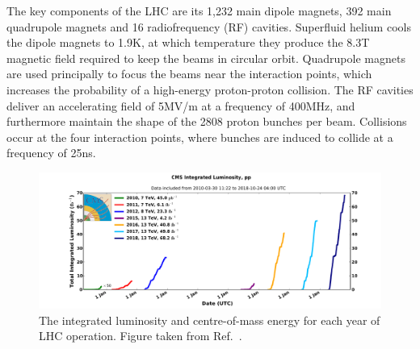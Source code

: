 The key components of the LHC are its 1,232 main dipole magnets, 392 main quadrupole magnets and 16 radiofrequency (RF) cavities.
Superfluid helium cools the dipole magnets to 1.9K, at which temperature they produce the 8.3T magnetic field required to keep the beams in circular orbit.
Quadrupole magnets are used principally to focus the beams near the interaction points, which increases the probability of a high-energy proton-proton collision.
The RF cavities deliver an accelerating field of 5MV/m at a frequency of 400MHz, and furthermore maintain the shape of the 2808 proton bunches per beam.
Collisions occur at the four interaction points, where bunches are induced to collide at a frequency of 25ns. 

\begin{figure}[h!]
  \centering
  \includegraphics[width=\textwidth]{Figures/Detector/Run1andRun2lumi.pdf}
  \caption[LHC integrated luminosity and centre-of-mass energy per year.]
  {
    The integrated luminosity and centre-of-mass energy for each year of LHC operation.
    Figure taken from Ref.~\cite{CMSLumiPublic}.
  }
  \label{fig:detector_Run1andRun2lumi}
\end{figure}

